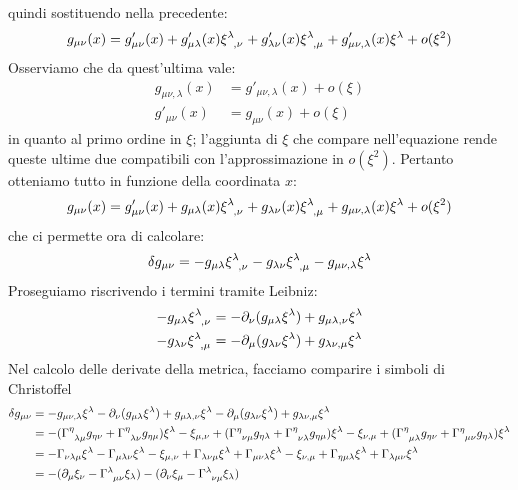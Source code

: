 quindi sostituendo nella precedente:
\begin{equation*}
    g_{\mu\nu}(x) = g'_{\mu\nu}(x) + g'_{\mu\lambda}(x) \tensor{\xi}{^\lambda_{,\nu}} + g'_{\lambda\nu}(x) \tensor{\xi}{^\lambda_{,\mu}} + g'_{\mu\nu , \lambda}(x) \xi^\lambda + o(\xi^2)
\end{equation*}
Osserviamo che da quest'ultima vale:
\begin{align*}
    g_{\mu\nu, \lambda}(x) &= g'_{\mu\nu, \lambda}(x) + o(\xi) \\
    g'_{\mu\nu}(x) &= g_{\mu\nu}(x) + o(\xi)
\end{align*}
in quanto al primo ordine in $\xi$; l'aggiunta di $\xi$ che compare nell'equazione rende queste ultime due compatibili con l'approssimazione in $o(\xi^2)$. Pertanto otteniamo tutto in funzione della coordinata $x$:
\begin{equation*}
    g_{\mu\nu}(x) = g'_{\mu\nu}(x) + g_{\mu\lambda}(x) \tensor{\xi}{^\lambda_{,\nu}} + g_{\lambda\nu}(x) \tensor{\xi}{^\lambda_{,\mu}} + g_{\mu\nu , \lambda}(x) \xi^\lambda + o(\xi^2)
\end{equation*}
che ci permette ora di calcolare:
\begin{equation*}
    \delta g_{\mu\nu} = - g_{\mu\lambda} \tensor{\xi}{^\lambda_{,\nu}} - g_{\lambda\nu} \tensor{\xi}{^\lambda_{,\mu}} -  g_{\mu\nu , \lambda} \xi^\lambda
\end{equation*}
Proseguiamo riscrivendo i termini tramite Leibniz:
\begin{align*}
    - g_{\mu\lambda}\tensor{\xi}{^\lambda_{,\nu}} &= -\partial_\nu( g_{\mu\lambda}\xi^\lambda) + g_{\mu\lambda,\nu}\xi^\lambda\\
    - g_{\lambda\nu}\tensor{\xi}{^\lambda_{,\mu}} &= -\partial_\mu( g_{\lambda\nu}\xi^\lambda) + g_{\lambda\nu,\mu}\xi^\lambda
\end{align*}
Nel calcolo delle derivate della metrica, facciamo comparire i simboli di Christoffel
\begin{align*}
    \delta g_{\mu\nu} &= - g_{\mu\nu , \lambda}\xi^\lambda  - \partial_\nu( g_{\mu\lambda}\xi^\lambda) + g_{\mu\lambda,\nu}\xi^\lambda - \partial_\mu( g_{\lambda\nu}\xi^\lambda) + g_{\lambda\nu,\mu}\xi^\lambda \\
    &= - (\tensor{\Gamma}{^\eta_{\lambda\mu}}g_{\eta\nu} + \tensor{\Gamma}{^\eta_{\lambda\nu}}g_{\eta\mu})\xi^\lambda  - \xi_{\mu,\nu} +
        (\tensor{\Gamma}{^\eta_{\nu\mu}}g_{\eta\lambda} + \tensor{\Gamma}{^\eta_{\nu\lambda}}g_{\eta\mu})\xi^\lambda - \xi_{\nu,\mu} +
        (\tensor{\Gamma}{^\eta_{\mu\lambda}}g_{\eta\nu} + \tensor{\Gamma}{^\eta_{\mu\nu}}g_{\eta\lambda})\xi^\lambda \\
    &= - \Gamma_{\nu\lambda\mu}\xi^\lambda - \Gamma_{\mu\lambda\nu}\xi^\lambda - \xi_{\mu,\nu} +\Gamma_{\lambda\nu\mu}\xi^\lambda +\Gamma_{\mu\nu\lambda}\xi^\lambda - \xi_{\nu,\mu} + \Gamma_{\eta\mu\lambda}\xi^\lambda + \Gamma_{\lambda\mu\nu}\xi^\lambda \\
    &= - (\partial_\mu \xi_\nu - \tensor{\Gamma}{^\lambda_{\mu\nu}}\xi_\lambda) - (\partial_\nu \xi_\mu - \tensor{\Gamma}{^\lambda_{\nu\mu}}\xi_\lambda)
\end{align*}
